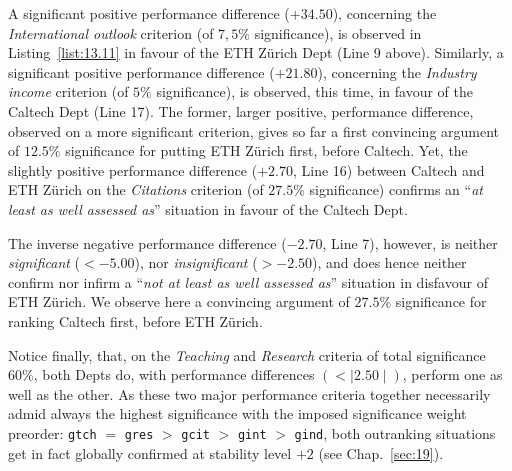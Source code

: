A significant positive performance difference ($+34.50$), concerning the \emph{International outlook} criterion (of $7,5\%$ significance), is observed in Listing~\vref{list:13.11} in favour of the ETH Zürich Dept (Line 9 above). Similarly, a significant positive performance difference ($+21.80$), concerning the \emph{Industry income} criterion (of $5\%$ significance), is observed, this time, in favour of the Caltech Dept (Line 17). The former, larger positive, performance difference, observed on a more significant criterion, gives so far a first convincing argument of $12.5\%$ significance for putting ETH Zürich first, before Caltech. Yet, the slightly positive performance difference ($+2.70$, Line 16) between Caltech and ETH Zürich on the \emph{Citations} criterion (of $27.5\%$ significance) confirms an ``\emph{at least as well assessed as}'' situation in favour of the Caltech Dept.

The inverse negative performance difference ($-2.70$, Line 7), however, is neither \emph{significant} ($< -5.00$), nor \emph{insignificant} ($> -2.50$), and does hence neither confirm nor infirm a ``\emph{not at least as well assessed as}'' situation in disfavour of ETH Zürich. We observe here a convincing argument of $27.5\%$ significance for ranking Caltech first, before ETH Zürich.

Notice finally, that, on the \emph{Teaching} and \emph{Research} criteria of total significance $60\%$, both Depts do, with performance differences $(< \mid 2.50 \mid)$, perform one as well as the other. As these two major performance criteria together necessarily admid always the highest significance with the imposed significance weight preorder: \texttt{gtch} $=$ \texttt{gres} $>$ \texttt{gcit} $>$ \texttt{gint} $>$ \texttt{gind}, both outranking situations get in fact globally confirmed at stability level $+2$ (see Chap.~\ref{sec:19}).

